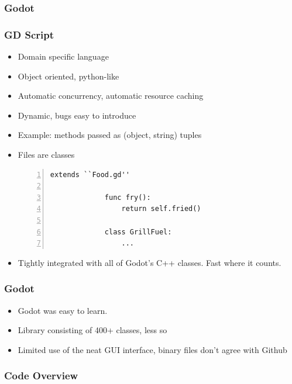 \documentclass{beamer}
\begin{document}
\begin{frame}
    \frametitle{Godot} %
\end{frame}

\begin{frame}[fragile]
    \frametitle{GD Script} %
    \begin{itemize}
        \pause \item Domain specific language
        \pause \item Object oriented, python-like
        \pause \item Automatic concurrency, automatic resource caching
        \pause \item Dynamic, bugs easy to introduce
        \pause \item Example: methods passed as (object, string) tuples

        \pause \item Files are classes

        \begin{Verbatim}[numbers=left]
             extends ``Food.gd''

             func fry():
                 return self.fried()

             class GrillFuel:
                 ...
        \end{Verbatim}

        \pause \item Tightly integrated with all of Godot's C++ classes. Fast
            where it counts.
    \end{itemize}
\end{frame}

\begin{frame}
    \frametitle{Godot} %
    \begin{itemize}
    \item Godot was easy to learn.
    \pause \item Library consisting of 400+ classes, less so
    \pause \item Limited use of the neat GUI interface, binary files don't
        agree with Github
    \end{itemize}

\end{frame}

\begin{frame}
    \frametitle{Code Overview} %
\end{frame}
\end{document}
